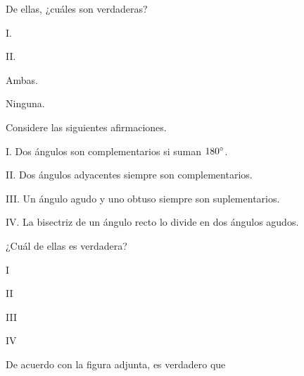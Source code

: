 \documentclass[12pt, fleqn]{article}
\begin{document}
De ellas, ¿cuáles son {\sc verdaderas}?
\benu
\item[] \opc I.
\item[] \opc II.
\item[] \opc Ambas.
\item[] \opc Ninguna.
\eenu
\vs

\item Considere las siguientes afirmaciones. \vp

\begin{tcolorbox}
\benu
\item[I.] Dos ángulos son complementarios si suman $180^\circ$.
\item[II.] Dos ángulos adyacentes siempre son complementarios.
\item[III.] Un ángulo agudo y uno obtuso siempre son suplementarios.
\item[IV.] La bisectriz de un ángulo recto lo divide en dos ángulos agudos.
\eenu
\end{tcolorbox}

¿Cuál de ellas es {\sc verdadera}?
\benu
\item[] \opc I
\item[] \opc II
\item[] \opc III
\item[] \opc IV
\eenu
\vs

\pagebreak

\item De acuerdo con la figura adjunta, es verdadero que
\end{document}
